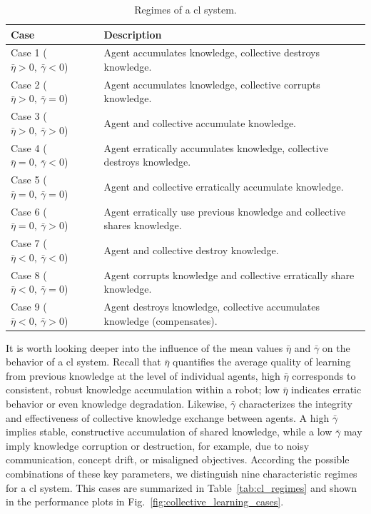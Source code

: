 \documentclass[12pt]{article}
\renewcommand{\arraystretch}{2}
\begin{document}
\begin{table}[t!]
	\centering
	\caption{\label{tab:cl_regimes} Regimes of a \ac{cl} system.}
	\renewcommand{\arraystretch}{1.2}
	\begin{tabular}[t]{|l| p{11cm}|}
		\hline
		\textbf{Case} & \textbf{Description}\\
		\hline
		Case 1 ($\bar{\eta} >0,~\bar{\gamma}<0$) & {Agent accumulates knowledge, collective destroys knowledge.} \\
		\hline
		Case 2 ($\bar{\eta} >0,~\bar{\gamma}=0$) & {Agent accumulates knowledge, collective corrupts knowledge.}\\
		\hline
		Case 3 ($\bar{\eta} >0,~\bar{\gamma}>0$) & {Agent and collective accumulate knowledge.}\\
		\hline
		Case 4 ($\bar{\eta} =0,~\bar{\gamma}<0$) & {Agent erratically accumulates knowledge, collective destroys knowledge.}\\
		\hline
		Case 5 ($\bar{\eta} =0,~\bar{\gamma}=0$) & {Agent and collective erratically accumulate knowledge.}\\
		\hline
		Case 6 ($\bar{\eta} =0,~\bar{\gamma}>0$) & {Agent erratically use previous knowledge and collective shares knowledge.}\\
		\hline
		Case 7 ($\bar{\eta} <0,~\bar{\gamma}<0$) & {Agent and collective destroy knowledge.}\\
		\hline
		Case 8 ($\bar{\eta} <0,~\bar{\gamma}=0$) & {Agent corrupts knowledge and collective erratically share knowledge.}\\
		\hline
		Case 9 ($\bar{\eta} <0,~\bar{\gamma}>0$) & {Agent destroys knowledge, collective accumulates knowledge (compensates).}\\
		\hline	
	\end{tabular}
	\label{tab:caption}
\end{table}%

It is worth looking deeper into the influence of the mean values $\bar{\eta}$ and $\bar{\gamma}$ on the behavior of a \ac{cl} system. Recall that $\bar{\eta}$ quantifies the average quality of learning from previous knowledge at the level of individual agents, high $\bar{\eta}$ corresponds to consistent, robust knowledge accumulation within a robot; low $\bar{\eta}$ indicates erratic behavior or even knowledge degradation. Likewise, $\bar{\gamma}$ characterizes the integrity and effectiveness of collective knowledge exchange between agents. A high $\bar{\gamma}$ implies stable, constructive accumulation of shared knowledge, while a low $\bar{\gamma}$ may imply knowledge corruption or destruction, for example, due to noisy communication, concept drift, or misaligned objectives. According the possible combinations of these key parameters, we distinguish nine characteristic regimes for a \ac{cl} system. This cases are summarized in Table~\ref{tab:cl_regimes} and shown in the performance plots in Fig.~\ref{fig:collective_learning_cases}.
\end{document}

